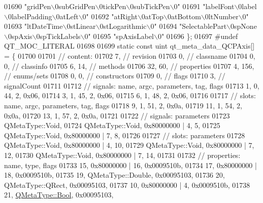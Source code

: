 \begin{DoxyCode}
01690     \textcolor{stringliteral}{"gridPen\(\backslash\)0subGridPen\(\backslash\)0tickPen\(\backslash\)0subTickPen\(\backslash\)0"}
01691     \textcolor{stringliteral}{"labelFont\(\backslash\)0label\(\backslash\)0labelPadding\(\backslash\)0atLeft\(\backslash\)0"}
01692     \textcolor{stringliteral}{"atRight\(\backslash\)0atTop\(\backslash\)0atBottom\(\backslash\)0ltNumber\(\backslash\)0"}
01693     \textcolor{stringliteral}{"ltDateTime\(\backslash\)0stLinear\(\backslash\)0stLogarithmic\(\backslash\)0"}
01694     \textcolor{stringliteral}{"SelectablePart\(\backslash\)0spNone\(\backslash\)0spAxis\(\backslash\)0spTickLabels\(\backslash\)0"}
01695     \textcolor{stringliteral}{"spAxisLabel\(\backslash\)0"}
01696 \};
01697 \textcolor{preprocessor}{#undef QT\_MOC\_LITERAL}
01698 
01699 \textcolor{keyword}{static} \textcolor{keyword}{const} uint qt\_meta\_data\_QCPAxis[] = \{
01700 
01701  \textcolor{comment}{// content:}
01702        7,       \textcolor{comment}{// revision}
01703        0,       \textcolor{comment}{// classname}
01704        0,    0, \textcolor{comment}{// classinfo}
01705        6,   14, \textcolor{comment}{// methods}
01706       32,   60, \textcolor{comment}{// properties}
01707        4,  156, \textcolor{comment}{// enums/sets}
01708        0,    0, \textcolor{comment}{// constructors}
01709        0,       \textcolor{comment}{// flags}
01710        3,       \textcolor{comment}{// signalCount}
01711 
01712  \textcolor{comment}{// signals: name, argc, parameters, tag, flags}
01713        1,    0,   44,    2, 0x06,
01714        3,    1,   45,    2, 0x06,
01715        6,    1,   48,    2, 0x06,
01716 
01717  \textcolor{comment}{// slots: name, argc, parameters, tag, flags}
01718        9,    1,   51,    2, 0x0a,
01719       11,    1,   54,    2, 0x0a,
01720       13,    1,   57,    2, 0x0a,
01721 
01722  \textcolor{comment}{// signals: parameters}
01723     QMetaType::Void,
01724     QMetaType::Void, 0x80000000 | 4,    5,
01725     QMetaType::Void, 0x80000000 | 7,    8,
01726 
01727  \textcolor{comment}{// slots: parameters}
01728     QMetaType::Void, 0x80000000 | 4,   10,
01729     QMetaType::Void, 0x80000000 | 7,   12,
01730     QMetaType::Void, 0x80000000 | 7,   14,
01731 
01732  \textcolor{comment}{// properties: name, type, flags}
01733       15, 0x80000000 | 16, 0x0009510b,
01734       17, 0x80000000 | 18, 0x0009510b,
01735       19, QMetaType::Double, 0x00095103,
01736       20, QMetaType::QRect, 0x00095103,
01737       10, 0x80000000 | 4, 0x0009510b,
01738       21, \hyperlink{a00001_a76a8b016e5ad61faf9062cc387df5016}{QMetaType::Bool}, 0x00095103,

\end{DoxyCode}
